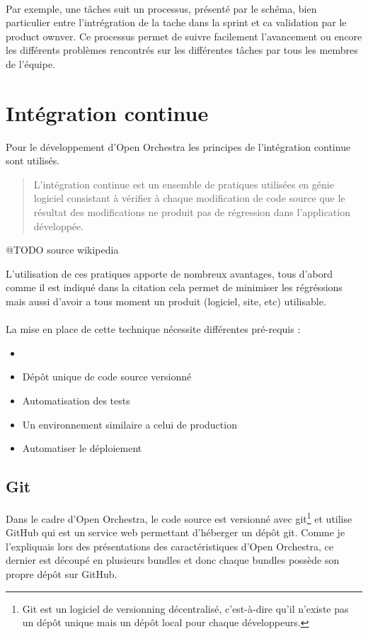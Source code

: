 \paragraph{}
Par exemple, une tâches suit un processus, présenté par le schéma, bien particulier entre l'intrégration de la tache dans la sprint et ca validation par le product ownver. Ce processus permet de suivre facilement l'avancement ou encore les différents problèmes rencontrés sur les différentes tâches par tous les membres de l'équipe.
\section{Intégration continue}
Pour le développement d'Open Orchestra les principes de l'intégration continue sont utilisés. 
\newline
\begin{quotation}
L'intégration continue est un ensemble de pratiques utilisées en génie logiciel consistant à vérifier à chaque modification de code source que le résultat des modifications ne produit pas de régression dans l'application développée.
\end{quotation}
@TODO source wikipedia

L'utilisation de ces pratiques apporte de nombreux avantages, tous d'abord comme il est indiqué dans la citation cela permet de minimiser les régréssions mais aussi d'avoir a tous moment un produit (logiciel, site, etc) utilisable.
\paragraph{}
La mise en place de cette technique nécessite différentes pré-requis : 
\begin{itemize}
\item[]
\item Dépôt unique de code source versionné
\item Automatisation des tests
\item Un environnement similaire a celui de production
\item Automatiser le déploiement
\end{itemize}

\subsection{Git}
Dans le cadre d'Open Orchestra, le code source est versionné avec git\footnote{Git est un logiciel de versionning décentralisé, c'est-à-dire qu'il n'existe pas un dépôt unique mais un dépôt local pour chaque développeurs.} et utilise GitHub qui est un service web permettant d'héberger un dépôt git. Comme je l'expliquais lors des présentations des caractéristiques d'Open Orchestra, ce dernier est découpé en plusieurs bundles et donc chaque bundles possède son propre dépôt sur GitHub.
